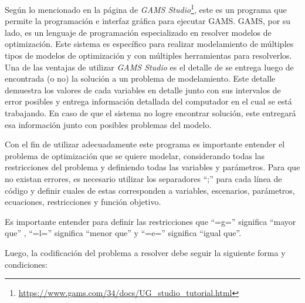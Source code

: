 Según lo mencionado en la página de \textit{GAMS Studio}\footnote{\url{https://www.gams.com/34/docs/UG_studio_tutorial.html}}, este es un programa que permite la programación e interfaz gráfica para ejecutar GAMS. GAMS, por su lado, es un lenguaje de programación especializado en resolver modelos de optimización. Este sistema es específico para realizar modelamiento de múltiples tipos de modelos de optimización y con múltiples herramientas para resolverlos. Una de las ventajas de utilizar \emph{GAMS Studio} es el detalle de se entrega luego de encontrada (o no) la solución a un problema de modelamiento. Este detalle demuestra los valores de cada variables en detalle junto con sus intervalos de error posibles y entrega información detallada del computador en el cual se está trabajando. En caso de que el sistema no logre encontrar solución, este entregará esa información junto con posibles problemas del modelo. 
\vspace{2.5mm}

Con el fin de utilizar adecuadamente este programa es importante entender el problema de optimización que se quiere modelar, considerando todas las restricciones del problema y definiendo todas las variables y parámetros. Para que no existan errores, es necesario utilizar los separadores “;” para cada línea de código y definir cuales de estas corresponden a variables, escenarios, parámetros, ecuaciones, restricciones y función objetivo. 
\vspace{2.5mm}

Es importante entender para definir las restricciones que “=g=” significa “mayor que” , “=l=” significa “menor que” y “=e=” significa “igual que”.

Luego, la codificación del problema a resolver debe seguir la siguiente forma y condiciones:

